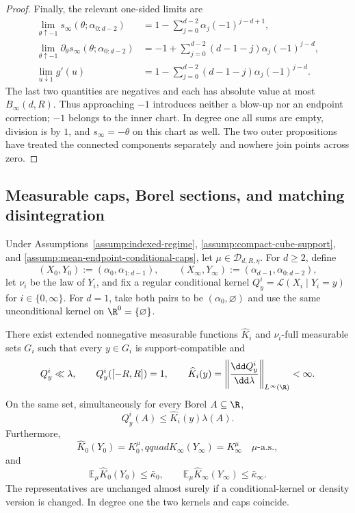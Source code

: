 \begin{proof}
Finally, the relevant one-sided limits are
\[
\begin{aligned}
\lim_{\theta\uparrow-1}s_\infty(\theta;\alpha_{0:d-2})
&=1-\sum_{j=0}^{d-2}\alpha_j(-1)^{j-d+1},\\
\lim_{\theta\uparrow-1}\partial_\theta s_\infty(\theta;\alpha_{0:d-2})
&=-1+\sum_{j=0}^{d-2}(d-1-j)\alpha_j(-1)^{j-d},\\
\lim_{u\downarrow1}g'(u)
&=1-\sum_{j=0}^{d-2}(d-1-j)\alpha_j(-1)^{j-d}.
\end{aligned}
\]
The last two quantities are negatives and each has absolute value at most
$B_\infty(d,R)$.  Thus approaching $-1$ introduces neither a blow-up nor an
endpoint correction; $-1$ belongs to the inner chart.  In degree one all
sums are empty, division is by $1$, and $s_\infty=-\theta$ on this chart as
well.  The two outer propositions have treated the connected components
separately and nowhere join points across zero.
\end{proof}

\subsection{Measurable caps, Borel sections, and matching disintegration}
\label{app:disintegration}

\begin{lemma}
\label{lem:kernel-caps}
Under Assumptions~\ref{assump:indexed-regime},
\ref{assump:compact-cube-support}, and
\ref{assump:mean-endpoint-conditional-caps}, let
$\mu\in\mathcal D_{d,R,\eta}$.  For $d\geq2$, define
\[
(X_0,Y_0):=(\alpha_0,\alpha_{1:d-1}),\qquad
(X_\infty,Y_\infty):=(\alpha_{d-1},\alpha_{0:d-2}),
\]
let $\nu_i$ be the law of $Y_i$, and fix a regular conditional kernel
$Q^i_y=\mathcal L(X_i\mid Y_i=y)$ for $i\in\{0,\infty\}$.  For $d=1$,
take both pairs to be $(\alpha_0,\varnothing)$ and use the same unconditional
kernel on $\R^0=\{\varnothing\}$.

There exist extended nonnegative measurable functions $\widehat K_i$ and
$\nu_i$-full measurable sets $G_i$ such that every $y\in G_i$ is
support-compatible and
\[
Q^i_y\ll\lambda,\qquad Q^i_y([-R,R])=1,\qquad
\widehat K_i(y)=\left\|\frac{\dd Q^i_y}{\dd\lambda}\right\|_{L^\infty(\R)}
<\infty.
\]
On the same set, simultaneously for every Borel $A\subseteq\R$,
\begin{equation}
Q^i_y(A)\leq\widehat K_i(y)\lambda(A).
\label{eq:kernel-domination}
\end{equation}
Furthermore,
\begin{equation}
\widehat K_0(Y_0)=K_0^\mu,qquad
\widehat K_\infty(Y_\infty)=K_\infty^\mu
\quad\mu\text{-a.s.},
\label{eq:cap-identities}
\end{equation}
and
\begin{equation}
\mathbb E_\mu\widehat K_0(Y_0)\leq\bar\kappa_0,
\qquad
\mathbb E_\mu\widehat K_\infty(Y_\infty)\leq\bar\kappa_\infty.
\label{eq:mean-cap-bounds}
\end{equation}
The representatives are unchanged almost surely if a conditional-kernel or
density version is changed.  In degree one the two kernels and caps coincide.
\end{lemma}

